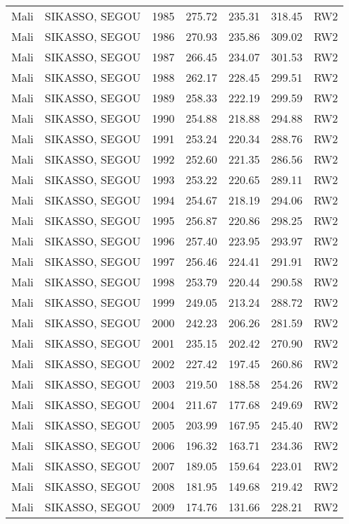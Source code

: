 \begin{longtable}{lllrrrl}
  Mali & SIKASSO, SEGOU & 1985 & 275.72 & 235.31 & 318.45 & RW2 \\ 
  Mali & SIKASSO, SEGOU & 1986 & 270.93 & 235.86 & 309.02 & RW2 \\ 
  Mali & SIKASSO, SEGOU & 1987 & 266.45 & 234.07 & 301.53 & RW2 \\ 
  Mali & SIKASSO, SEGOU & 1988 & 262.17 & 228.45 & 299.51 & RW2 \\ 
  Mali & SIKASSO, SEGOU & 1989 & 258.33 & 222.19 & 299.59 & RW2 \\ 
  Mali & SIKASSO, SEGOU & 1990 & 254.88 & 218.88 & 294.88 & RW2 \\ 
  Mali & SIKASSO, SEGOU & 1991 & 253.24 & 220.34 & 288.76 & RW2 \\ 
  Mali & SIKASSO, SEGOU & 1992 & 252.60 & 221.35 & 286.56 & RW2 \\ 
  Mali & SIKASSO, SEGOU & 1993 & 253.22 & 220.65 & 289.11 & RW2 \\ 
  Mali & SIKASSO, SEGOU & 1994 & 254.67 & 218.19 & 294.06 & RW2 \\ 
  Mali & SIKASSO, SEGOU & 1995 & 256.87 & 220.86 & 298.25 & RW2 \\ 
  Mali & SIKASSO, SEGOU & 1996 & 257.40 & 223.95 & 293.97 & RW2 \\ 
  Mali & SIKASSO, SEGOU & 1997 & 256.46 & 224.41 & 291.91 & RW2 \\ 
  Mali & SIKASSO, SEGOU & 1998 & 253.79 & 220.44 & 290.58 & RW2 \\ 
  Mali & SIKASSO, SEGOU & 1999 & 249.05 & 213.24 & 288.72 & RW2 \\ 
  Mali & SIKASSO, SEGOU & 2000 & 242.23 & 206.26 & 281.59 & RW2 \\ 
  Mali & SIKASSO, SEGOU & 2001 & 235.15 & 202.42 & 270.90 & RW2 \\ 
  Mali & SIKASSO, SEGOU & 2002 & 227.42 & 197.45 & 260.86 & RW2 \\ 
  Mali & SIKASSO, SEGOU & 2003 & 219.50 & 188.58 & 254.26 & RW2 \\ 
  Mali & SIKASSO, SEGOU & 2004 & 211.67 & 177.68 & 249.69 & RW2 \\ 
  Mali & SIKASSO, SEGOU & 2005 & 203.99 & 167.95 & 245.40 & RW2 \\ 
  Mali & SIKASSO, SEGOU & 2006 & 196.32 & 163.71 & 234.36 & RW2 \\ 
  Mali & SIKASSO, SEGOU & 2007 & 189.05 & 159.64 & 223.01 & RW2 \\ 
  Mali & SIKASSO, SEGOU & 2008 & 181.95 & 149.68 & 219.42 & RW2 \\ 
  Mali & SIKASSO, SEGOU & 2009 & 174.76 & 131.66 & 228.21 & RW2 \\ 

\end{longtable}
